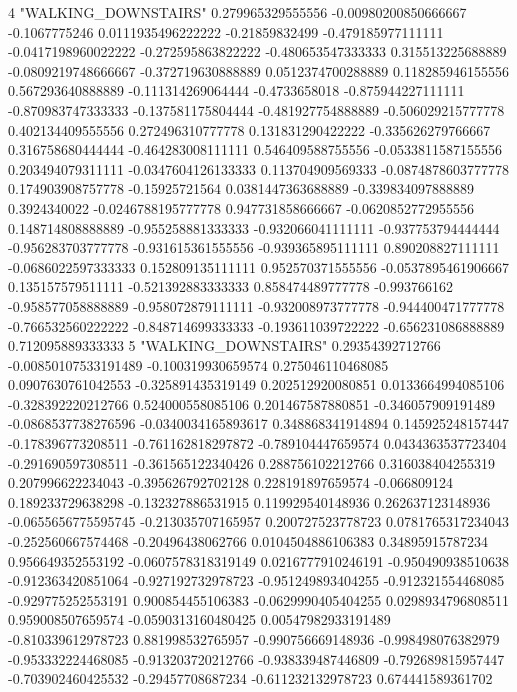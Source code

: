 4 "WALKING_DOWNSTAIRS" 0.279965329555556 -0.00980200850666667 -0.1067775246 0.0111935496222222 -0.21859832499 -0.479185977111111 -0.0417198960022222 -0.272595863822222 -0.480653547333333 0.315513225688889 -0.0809219748666667 -0.372719630888889 0.0512374700288889 0.118285946155556 0.567293640888889 -0.111314269064444 -0.4733658018 -0.875944227111111 -0.870983747333333 -0.137581175804444 -0.481927754888889 -0.506029215777778 0.402134409555556 0.272496310777778 0.131831290422222 -0.335626279766667 0.316758680444444 -0.464283008111111 0.546409588755556 -0.0533811587155556 0.203494079311111 -0.0347604126133333 0.113704909569333 -0.0874878603777778 0.174903908757778 -0.15925721564 0.0381447363688889 -0.339834097888889 0.3924340022 -0.0246788195777778 0.947731858666667 -0.0620852772955556 0.148714808888889 -0.955258881333333 -0.932066041111111 -0.937753794444444 -0.956283703777778 -0.931615361555556 -0.939365895111111 0.890208827111111 -0.0686022597333333 0.152809135111111 0.952570371555556 -0.0537895461906667 0.135157579511111 -0.521392883333333 0.858474489777778 -0.993766162 -0.958577058888889 -0.958072879111111 -0.932008973777778 -0.944400471777778 -0.766532560222222 -0.848714699333333 -0.193611039722222 -0.656231086888889 0.712095889333333
5 "WALKING_DOWNSTAIRS" 0.29354392712766 -0.00850107533191489 -0.100319930659574 0.275046110468085 0.0907630761042553 -0.325891435319149 0.202512920080851 0.0133664994085106 -0.328392220212766 0.524000558085106 0.201467587880851 -0.346057909191489 -0.0868537738276596 -0.0340034165893617 0.348868341914894 0.145925248157447 -0.178396773208511 -0.761162818297872 -0.789104447659574 0.0434363537723404 -0.291690597308511 -0.361565122340426 0.288756102212766 0.316038404255319 0.207996622234043 -0.395626792702128 0.228191897659574 -0.066809124 0.189233729638298 -0.132327886531915 0.119929540148936 0.262637123148936 -0.0655656775595745 -0.213035707165957 0.200727523778723 0.0781765317234043 -0.252560667574468 -0.20496438062766 0.0104504886106383 0.34895915787234 0.956649352553192 -0.0607578318319149 0.0216777910246191 -0.950490938510638 -0.912363420851064 -0.927192732978723 -0.951249893404255 -0.912321554468085 -0.929775252553191 0.900854455106383 -0.0629990405404255 0.0298934796808511 0.959008507659574 -0.0590313160480425 0.00547982933191489 -0.810339612978723 0.881998532765957 -0.990756669148936 -0.998498076382979 -0.953332224468085 -0.913203720212766 -0.938339487446809 -0.792689815957447 -0.703902460425532 -0.29457708687234 -0.611232132978723 0.674441589361702
